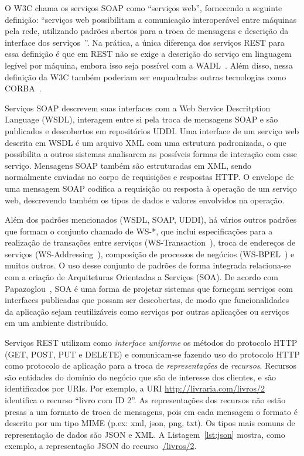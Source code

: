 O W3C chama os serviços SOAP como ``serviços web'', fornecendo a seguinte definição: ``serviços web possibilitam a comunicação interoperável entre máquinas pela rede, utilizando padrões abertos para a troca de mensagens e descrição da interface dos serviços~\cite{W3C2004WS}''. Na prática, a única diferença dos serviços REST para essa definição é que em REST não se exige a descrição do serviço em linguagem legível por máquina, embora isso seja possível com a WADL~\cite{WADL2006}. Além disso, nessa definição da W3C também poderiam ser enquadradas outras tecnologias como CORBA~\cite{CORBA1995}. 

Serviços SOAP descrevem suas interfaces com a Web Service Descritption Language (WSDL), interagem entre si pela troca de mensagens SOAP e são publicados e descobertos em repositórios UDDI. Uma interface de um serviço web descrita em WSDL é um arquivo XML com uma estrutura padronizada, o que possibilita a outros sistemas analisarem as possíveis formas de interação com esse serviço. Mensagens SOAP também são estruturadas em XML, sendo normalmente enviadas no corpo de requisições e respostas HTTP. O envelope de uma mensagem SOAP codifica a requisição ou resposta à operação de um serviço web, descrevendo também os tipos de dados e valores envolvidos na operação. 

Além dos padrões mencionados (WSDL, SOAP, UDDI), há vários outros padrões que formam o conjunto chamado de WS-*, que inclui especificações para a realização de transações entre serviços (WS-Transaction~\cite{WSTrans2002}), troca de endereços de serviços (WS-Addressing~\cite{W3C2004Addressing}), composição de processos de negócios (WS-BPEL~\cite{BPEL2007}) e muitos outros. O uso desse conjunto de padrões de forma integrada relaciona-se com a criação de Arquiteturas Orientadas a Serviços (SOA). De acordo com Papazoglou~\cite{Papazoglou2007State}, SOA é uma forma de projetar sistemas que forneçam serviços com interfaces publicadas que possam ser descobertas, de modo que funcionalidades da aplicação sejam reutilizáveis como serviços por outras aplicações ou serviços em um ambiente distribuído. 

Serviços REST utilizam como \emph{interface uniforme} os métodos do protocolo HTTP (GET, POST, PUT e DELETE) e comunicam-se fazendo uso do protocolo HTTP como protocolo de aplicação para a troca de \emph{representações} de \emph{recursos}. 
Recursos são entidades do domínio do negócio que são de interesse dos clientes, e são identificados por URIs. Por exemplo, a URI \url{http://livraria.com/livros/2} identifica o recurso ``livro com ID 2''. 
As representações dos recursos não estão presas a um formato de troca de mensagens, pois em cada mensagem o formato é descrito por um tipo MIME (p.ex: xml, json, png, txt). Os tipos mais comuns de representação de dados são JSON e XML. A Listagem~\ref{lst:json} mostra, como exemplo, a representação JSON do recurso~\url{/livros/2}.


